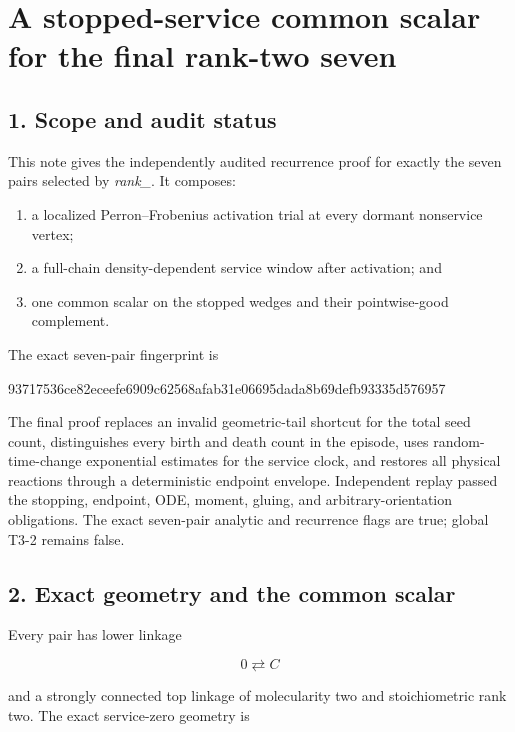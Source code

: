 \section{A stopped-service common scalar for the final rank-two
seven}

\subsection{1. Scope and audit status}

This note gives the independently audited recurrence proof for exactly
the seven pairs selected by \emph{rank\_\texttt{}}. It
composes:

\begin{enumerate}
\def\labelenumi{\arabic{enumi}.}
\tightlist
\item
  a localized Perron--Frobenius activation trial at every dormant
  nonservice vertex;
\item
  a full-chain density-dependent service window after activation; and
\item
  one common scalar on the stopped wedges and their pointwise-good
  complement.
\end{enumerate}

The exact seven-pair fingerprint is

\begin{CodeBlock}
93717536ce82eceefe6909c62568afab31e06695dada8b69defb93335d576957
\end{CodeBlock}

The final proof replaces an invalid geometric-tail shortcut for the
total seed count, distinguishes every birth and death count in the
episode, uses random-time-change exponential estimates for the service
clock, and restores all physical reactions through a deterministic
endpoint envelope. Independent replay passed the stopping, endpoint,
ODE, moment, gluing, and arbitrary-orientation obligations. The exact
seven-pair analytic and recurrence flags are true; global T3-2 remains
false.

\subsection{2. Exact geometry and the common
scalar}

Every pair has lower linkage

\[
                         0\rightleftarrows C             \tag{2.1}
\]

and a strongly connected top linkage of molecularity two and
stoichiometric rank two. The exact service-zero geometry is

